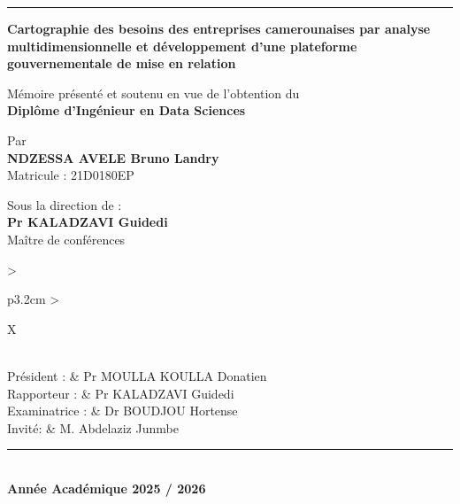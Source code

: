 \documentclass[12pt, a4paper, oneside]{report}
\newcommand{\auteur}{NDZESSA AVELE Bruno Landry}
\newcommand{\matricule}{21D0180EP}
\newcommand{\annee}{2025 / 2026}
\newcommand{\titredoc}{Cartographie des besoins des entreprises camerounaises par analyse multidimensionnelle et développement d'une plateforme gouvernementale de mise en relation}
\begin{document}
\begin{titlepage}
\begin{center}
			\vspace{0.15cm}
			\textcolor{primary}{\rule{\linewidth}{1.5pt}}
			\vspace{0.5cm}
			
			\begin{tcolorbox}[
				colback=primary!6, colframe=primary,
				arc=5pt, boxrule=1pt,
				left=12pt, right=12pt, top=10pt, bottom=10pt
				]
				\centering
				{\large\bfseries\color{primary} \titredoc}
			\end{tcolorbox}
			
			\vspace{0.45cm}
			
			{\normalsize Mémoire présenté et soutenu en vue de l'obtention du}\\[5pt]
			{\large\bfseries\color{primary} Diplôme d'Ingénieur  en Data Sciences}
			
			\vspace{0.45cm}
			
			{\normalsize Par }\\[5pt]
			{\large\bfseries \auteur}\\[3pt]
			{\small Matricule : \matricule}
			
			\vspace{0.4cm}
			
			{\normalsize Sous la direction de :}\\[5pt]
			{\large\bfseries\color{primary} Pr KALADZAVI Guidedi}\\[2pt]
			{\small Ma\^itre de conférences}
			
			\vspace{0.4cm}
			
			\begin{tabularx}{\textwidth}{>{\bfseries\raggedright\arraybackslash}p{3.2cm}
					>{\raggedright\arraybackslash}X}
				\\[6pt]
				Président :    & Pr MOULLA KOULLA Donatien \\[4pt]
				Rapporteur :   & Pr KALADZAVI Guidedi \\[4pt]
				Examinatrice : & Dr BOUDJOU Hortense \\[4pt]
				Invité: & M. Abdelaziz Junmbe
			\end{tabularx}
			
			\vfill
			
			\textcolor{primary}{\rule{\linewidth}{1pt}}\\[5pt]
			{\bfseries Année Académique \annee}
			
		\end{center}
		\restoregeometry
	\end{titlepage}
	
\end{document}
